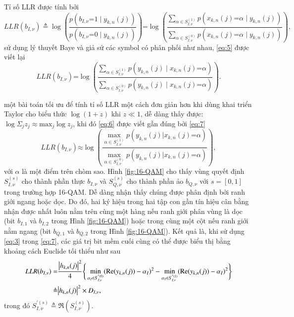 Tỉ số LLR được tính bởi
\begin{equation}
	LLR(b_{I,\nu})  \triangleq \log \left(\dfrac{p(b_{I,\nu} \mathord{=} 1 \mid y_{k,n}(j))}{p(b_{I,\nu} \mathord{=} 0 \mid y_{k,n}(j))}\right)
	\mathord{=} \log \left(\dfrac{\sum_{\alpha\in S_{I,\nu}^{(1)}}p(x_{k,n}(j)\mathord{=} \alpha\mid y_{k,n}(j))}{\sum_{\alpha\in S_{I,\nu}^{(0)}}p(x_{k,n}(j)\mathord{=} \alpha\mid y_{k,n}(j))}\right),
	\label{eq:5}
\end{equation}
sử dụng lý thuyết Baye và giả sử các symbol có phân phối như nhau, \eqref{eq:5} được viết lại
\begin{equation}
	LLR(b_{I,\nu})\mathord{=}\log \left(\dfrac{\sum_{\alpha\in S_{I,\nu}^{(1)}}p(y_{k,n}(j) \mid x_{k,n}(j)\mathord{=} \alpha)}
		{\sum_{\alpha\in S_{I,\nu}^{(0)}}p(y_{k,n}(j) \mid x_{k,n}(j)\mathord{=} \alpha)}\right).
	\label{eq:6}
\end{equation}

một bài toán tối ưu để tính tỉ số LLR một cách đơn giản hơn khi dùng khai triển Taylor cho biểu thức $\log (1+z)$ khi $z \ll 1$, dễ dàng thấy được: $\log \Sigma_jz_j \approx \text{max}_j \log z_j$, khi đó \eqref{eq:6} được viết gần đúng bởi \eqref{eq:7}
\begin{equation}
	LLR(b_{I,\nu}) \mathord{\approx}\log \left(\dfrac{\max_{\alpha\in S_{I,\nu}^{(1)}} p(y_{k,n}(j) \mathord{\mid} x_{k,n}(j)\mathord{=} \alpha)}
		{\max_{\alpha\in S_{I,\nu}^{(0)}} p(y_{k,n}(j) \mathord{\mid} x_{k,n}(j)\mathord{=} \alpha)}\right),
	\label{eq:7}
\end{equation}
với $\alpha$ là một điểm trên chòm sao. Hình \ref{fig:16-QAM} cho thấy vùng quyết định $S_{I,\nu}^{(s)}$ cho thành phần thực $b_{I,\nu}$ và $S_{Q,\nu}^{(s)}$ cho thành phần ảo $b_{Q,\nu}$ với $s=[0,1]$ trong trường hợp 16-QAM. Dễ dàng nhận thấy chúng được phân định bởi ranh giới ngang hoặc dọc. Do đó, hai ký hiệu trong hai tập con gần tín hiệu cân bằng nhận được nhất luôn nằm trên cùng một hàng nếu ranh giới phân vùng là dọc (bit $b_{I,1}$ và $b_{I,2}$ trong Hình \ref{fig:16-QAM}) hoặc trong cùng một cột nếu ranh giới nằm ngang (bit $b_{Q,1}$ và $b_{Q,2}$ trong Hình \ref{fig:16-QAM}). Kết quả là, khi sử dụng \eqref{eq:3} trong \eqref{eq:7}, các giá trị bit mềm cuối cùng có thể được biểu thị bằng khoảng cách Euclide tối thiểu như sau
\begin{equation}
	\begin{split}
		LLR(b_{I,\nu}) =&\dfrac{\absolutevalue{h_{k,n}(j)}^2}{4} \Bigg\{ \min_{\alpha_I \in S_{I,\nu}^{'(0)}}(\Re(y_{k,n}(j)) - \alpha_I)^2 - \min_{\alpha_I \in S_{I,\nu}^{'(1)}}(\Re(y_{k,n}(j)) - \alpha_I)^2 \Bigg\}\\
		\triangleq & \absolutevalue{h_{k,n}(j)}^2 \times D_{I,\nu},
	\end{split}
	\label{eq:8}
\end{equation}
trong đó $S_{I,\nu}^{'(s)} \triangleq \Re(S_{I,\nu}^{(s)})$.

